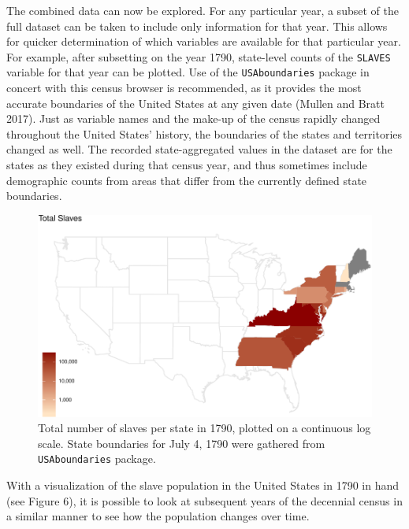 \documentclass[11pt,]{article}
\begin{document}
The combined data can now be explored. For any particular year, a subset
of the full dataset can be taken to include only information for that
year. This allows for quicker determination of which variables are
available for that particular year. For example, after subsetting on the
year 1790, state-level counts of the \texttt{SLAVES} variable for that
year can be plotted. Use of the \texttt{USAboundaries} package in
concert with this census browser is recommended, as it provides the most
accurate boundaries of the United States at any given date (Mullen and
Bratt 2017). Just as variable names and the make-up of the census
rapidly changed throughout the United States' history, the boundaries of
the states and territories changed as well. The recorded
state-aggregated values in the dataset are for the states as they
existed during that census year, and thus sometimes include demographic
counts from areas that differ from the currently defined state
boundaries.

\begin{figure}[htbp]
\centering
\includegraphics{writeup_files/figure-latex/chunk-1790-map-1.pdf}
\caption{Total number of slaves per state in 1790, plotted on a
continuous log scale. State boundaries for July 4, 1790 were gathered
from \texttt{USAboundaries} package.}
\end{figure}

With a visualization of the slave population in the United States in
1790 in hand (see Figure 6), it is possible to look at subsequent years
of the decennial census in a similar manner to see how the population
changes over time.
\end{document}
